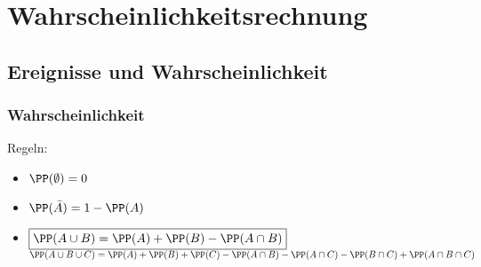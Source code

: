\newcommand{\customDir}{../}








\renewenvironment{anumerate}{\begin{enumerate}[label=(\alph*)]}{\end{enumerate}} %


%


\maketitle
\newpage
\chapter{Wahrscheinlichkeitsrechnung}
\section{Ereignisse und Wahrscheinlichkeit}
\subsection{Wahrscheinlichkeit}
Regeln:
\begin{itemize}
\item $\PP(\emptyset)=0$
\item $\PP(\bar A) = 1 - \PP (A)$
\item $\boxed{\PP(A \cup B)=\PP(A)+\PP(B)-\PP(A \cap B)}$\\
$\PP ( A \cup B \cup C) = \PP(A) + \PP(B) + \PP(C)-\PP(A \cap B) - \PP(A\cap C) - \PP(B\cap C ) + \PP(A \cap B \cap C)$
\end{itemize}

